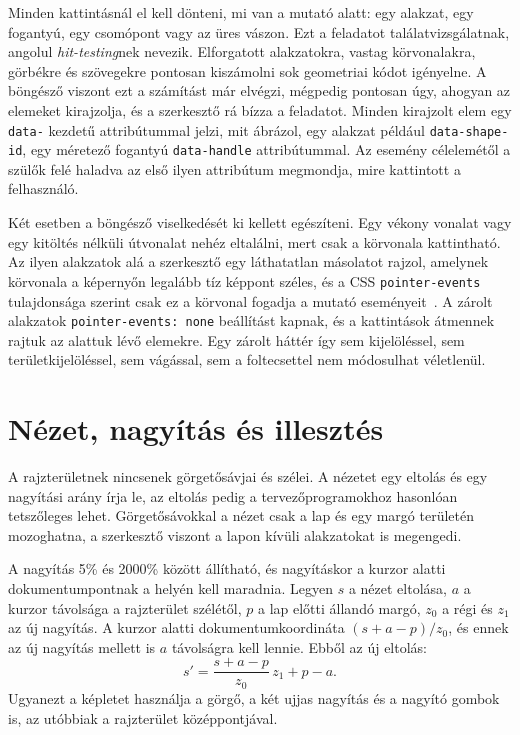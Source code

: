 Minden kattintásnál el kell dönteni, mi van a mutató alatt: egy alakzat, egy fogantyú, egy csomópont vagy az üres vászon. Ezt a feladatot találatvizsgálatnak, angolul \textit{hit-testing}nek nevezik. Elforgatott alakzatokra, vastag körvonalakra, görbékre és szövegekre pontosan kiszámolni sok geometriai kódot igényelne. A böngésző viszont ezt a számítást már elvégzi, mégpedig pontosan úgy, ahogyan az elemeket kirajzolja, és a szerkesztő rá bízza a feladatot. Minden kirajzolt elem egy \texttt{data-} kezdetű attribútummal jelzi, mit ábrázol, egy alakzat például \texttt{data-shape-id}, egy méretező fogantyú \texttt{data-handle} attribútummal. Az esemény célelemétől a szülők felé haladva az első ilyen attribútum megmondja, mire kattintott a felhasználó.

Két esetben a böngésző viselkedését ki kellett egészíteni. Egy vékony vonalat vagy egy kitöltés nélküli útvonalat nehéz eltalálni, mert csak a körvonala kattintható. Az ilyen alakzatok alá a szerkesztő egy láthatatlan másolatot rajzol, amelynek körvonala a képernyőn legalább tíz képpont széles, és a CSS \texttt{pointer-events} tulajdonsága szerint csak ez a körvonal fogadja a mutató eseményeit~\cite{mdn-pointer-events-css}. A zárolt alakzatok \texttt{pointer-events: none} beállítást kapnak, és a kattintások átmennek rajtuk az alattuk lévő elemekre. Egy zárolt háttér így sem kijelöléssel, sem területkijelöléssel, sem vágással, sem a foltecsettel nem módosulhat véletlenül.

\section{Nézet, nagyítás és illesztés}
\label{sec:viewport}

A rajzterületnek nincsenek görgetősávjai és szélei. A nézetet egy eltolás és egy nagyítási arány írja le, az eltolás pedig a tervezőprogramokhoz hasonlóan tetszőleges lehet. Görgetősávokkal a nézet csak a lap és egy margó területén mozoghatna, a szerkesztő viszont a lapon kívüli alakzatokat is megengedi.

A nagyítás 5\% és 2000\% között állítható, és nagyításkor a kurzor alatti dokumentumpontnak a helyén kell maradnia. Legyen $s$ a nézet eltolása, $a$ a kurzor távolsága a rajzterület szélétől, $p$ a lap előtti állandó margó, $z_0$ a régi és $z_1$ az új nagyítás. A kurzor alatti dokumentumkoordináta $(s+a-p)/z_0$, és ennek az új nagyítás mellett is $a$ távolságra kell lennie. Ebből az új eltolás:
\[
s' = \frac{s + a - p}{z_0}\, z_1 + p - a .
\]
Ugyanezt a képletet használja a görgő, a két ujjas nagyítás és a nagyító gombok is, az utóbbiak a rajzterület középpontjával.

